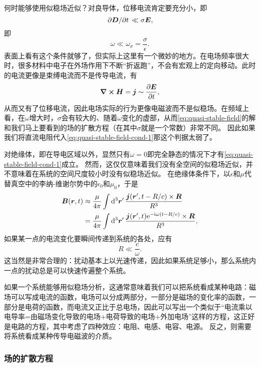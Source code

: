 \documentclass[UTF8, a4paper]{ctexart}
\newcommand*{\ee}{\mathrm{e}}
\newcommand*{\ii}{\mathrm{i}}
\begin{document}
何时能够使用似稳场近似？对良导体，位移电流肯定要充分小，即
\[
    \pdv*{\vb*{D}}{t} \ll \sigma \vb*{E},
\]
即
\begin{equation}
    \omega \ll \omega_\sigma = \frac{\sigma}{\epsilon}.
    \label{eq:quasi-stable-field-cond-1}
\end{equation}
表面上看有这个条件就够了，但实际上这里有一个微妙的地方。在电场频率很大时，很多材料中电子在外场作用下不断“折返跑”，不会有宏观上的定向移动。此时的电流更像是束缚电流而不是传导电流，有
\[
    \curl{\vb*{H}} = \vb*{j} \sim \pdv{\vb*{E}}{t},
\]
从而又有了位移电流，因此电场实际的行为更像电磁波而不是似稳场。在频域上看，在$\omega$增大时，$\sigma$会有较大的、随着$\omega$变化的虚部，从而\eqref{eq:quasi-stable-field}的解和我们马上要看到的场的扩散方程（在其中$\sigma$就是一个常数）非常不同。
因此如果我们将直流电阻代入\eqref{eq:quasi-stable-field-cond-1}那这个判据太弱了。

对绝缘体，即在导电区域以外，显然只有$\omega=0$即完全静态的情况下才有\eqref{eq:quasi-stable-field-cond-1}成立。
然而，这仅仅意味着我们没有全空间的似稳场近似，并不意味着在系统的空间尺度较小时没有似稳场近似。
在绝缘体条件下，以$\epsilon$和$\mu$代替真空中的李纳-维谢尔势中的$\epsilon_0$和$\mu_0$，于是
\[
    \begin{aligned}
        \vb*{B}(\vb*{r}, t) &\approx \frac{\mu}{4\pi} \int \dd[3]{\vb*{r}'} \frac{\vb*{j}(\vb*{r}', t - R / c) \times \vb*{R}}{R^3} \\
        &= \frac{\mu}{4\pi} \int \dd[3]{\vb*{r}'} \frac{\vb*{j}(\vb*{r}', t) \ee^{- \ii \omega (t - R / c)} \times \vb*{R}}{R^3},
    \end{aligned}
\]
如果某一点的电流变化要瞬间传递到系统的各处，应有
\begin{equation}
    R \ll \frac{c}{\omega}.
\end{equation}
这当然是非常合理的：扰动基本上以光速传递，因此如果系统足够小，那么系统内一点的扰动总是可以快速传遍整个系统。

如果一个系统能够用似稳场分析，这通常意味着我们可以把系统看成某种电路：磁场可以写成电流的函数，电场可以分成两部分，一部分是磁场的变化率的函数，一部分是电荷的函数，而电流又正比于总电场，因此可以写出一个类似于“电流乘以电导率=由磁场变化导致的电场+电荷导致的电场+外加电场”这样的方程，这正好是电路的方程，其中考虑了四种效应：电阻、电感、电容、电源。
反之，则需要将系统看成某种传导电磁波的介质。

\subsubsection{场的扩散方程}
\end{document}
